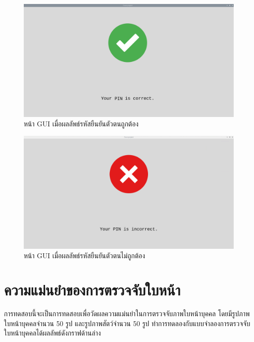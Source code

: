 \begin{figure}[!ht]
  \begin{center}
    \includegraphics[scale=.25]{pic/pin_correct.png}
    \caption[หน้า GUI เมื่อผลลัพธ์รหัสยืนยันตัวตนถูกต้อง]{หน้า GUI เมื่อผลลัพธ์รหัสยืนยันตัวตนถูกต้อง}
    \label{fig:pin_correct}
  \end{center}
\end{figure}


\begin{figure}[!ht]
  \begin{center}
    \includegraphics[scale=.25]{pic/pin_incorrect.png}
    \caption[หน้า GUI เมื่อผลลัพธ์รหัสยืนยันตัวตนไม่ถูกต้อง]{หน้า GUI เมื่อผลลัพธ์รหัสยืนยันตัวตนไม่ถูกต้อง}
    \label{fig:pin_incorrect}
  \end{center}
\end{figure}

\newpage

\section{ความแม่นยำของการตรวจจับใบหน้า}
การทดสอบนี้จะเป็นการทดสอบเพื่อวัดผลความแม่นยำในการตรวจจับภาพใบหน้าบุคคล โดยมีรูปภาพใบหน้าบุคคลจำนวน 50 รูป และรูปภาพสัตว์จำนวน 50 รูป 
ทำการทดลองกับแบบจำลองการตรวจจับใบหน้าบุคคลได้ผลลัพธ์ดังกราฟด้านล่าง

